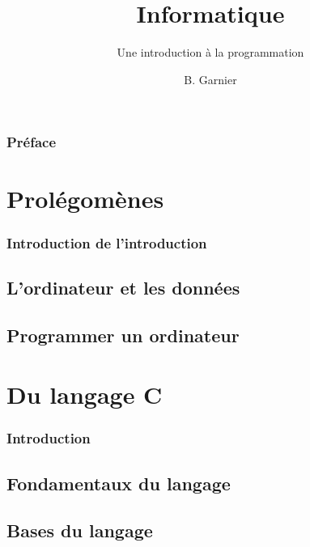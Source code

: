 \documentclass{minitelreport}
\begin{document}
\title{Informatique}
\subtitle{Une introduction à la programmation}
\author{B. Garnier}
\maketitle
\begin{refsection}
\section*{Préface}

\tableofcontents
\listoftables
\listofdefinition
\newpage
\part{Prolégomènes}
\label{part:prol_gom_nes}
	\section*{Introduction de l'introduction}
	
	\chapter{L'ordinateur et les données}
	\label{cha:l_ordinateur_et_les_donn_es}
		
	\chapter{Programmer un ordinateur}
		\label{cha:programmer_un_ordinateur}
		
\part{Du langage C}
\label{part:du_langage_c}
	\section*{Introduction}
	
	\chapter{Fondamentaux du langage}
	\label{chap:fondamentaux_du_langage}
		
	\chapter{Bases du langage}
	\label{chap:bases_du_langage}

\end{refsection}
\end{document}
